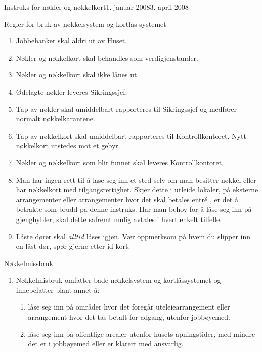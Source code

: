 \begin{instruks}{Instruks for nøkler og nøkkelkort}{1. januar 2008}{3. april 2008}
    \begin{instruksledd}{Regler for bruk av nøkkelsystem og kortlås-systemet}
        \begin{enumerate}
            \item Jobbehanker skal aldri ut av Huset.
            \item Nøkler og nøkkelkort skal behandles som verdigjenstander.
            \item Nøkler og nøkkelkort skal ikke lånes ut.
            \item Ødelagte nøkler leveres Sikringssjef.
            \item Tap av nøkler skal umiddelbart rapporteres til Sikringssjef og medfører normalt
                nøkkelkarantene.
            \item Tap av nøkkelkort skal umiddelbart rapporteres til Kontrollkontoret. Nytt
                nøkkelkort utstedes mot et gebyr.
            \item Nøkler og nøkkelkort som blir funnet skal leveres Kontrollkontoret.
            \item Man har ingen rett til å låse seg inn et sted selv om man besitter
                nøkkel eller har nøkkelkort med
                tilgangsrettighet. Skjer dette i utleide lokaler, på eksterne
                arrangementer eller arrangementer hvor det skal
                betales entr\'e , er det å betrakte som brudd på denne instruks. Har man
                behov for å låse seg inn på gjenghybler,
                skal dette såfremt mulig avtales i hvert enkelt tilfelle.
            \item Låste dører skal \emph{alltid} låses igjen. Vær oppmerksom på hvem du slipper inn
                en låst dør, spør gjerne etter id-kort.
        \end{enumerate}
    \end{instruksledd}

    \begin{instruksledd}{Nøkkelmissbruk}
        \begin{enumerate}
            \item Nøkkelmisbruk omfatter både nøkkelsystem og kortlåssystemet og
                innebefatter blant annet å:
                \begin{enumerate}
                    \item  låse seg inn på områder hvor det foregår uteleiearrangement
                        eller arrangement hvor det tas betalt for
                        adgang, utenfor jobbøyemed.
                    \item låse seg inn på offentlige arealer utenfor husets
                        åpningstider, med mindre det er i jobbøyemed eller er
                        klarert med ansvarlig.
                \end{enumerate}
        \end{enumerate}
    \end{instruksledd}


\end{instruks}
